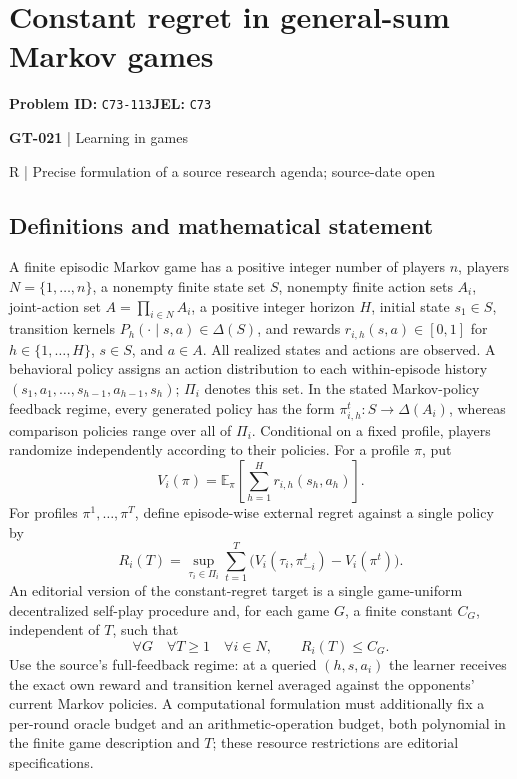 \documentclass[11pt,a4paper]{article}
\begin{document}
\section*{Constant regret in general-sum Markov games}
\textbf{Problem ID:} \texttt{C73-113}\quad \textbf{JEL:} \texttt{C73}\par
\label{problem:OP-0151}
\label{game:GT-021}
{\sffamily\small\color{muted}
{\sffamily\small\color{muted}\textbf{GT-021} | Learning in games\par R | Precise formulation of a source research agenda; source-date open\par}
\par}
\subsection*{Definitions and mathematical statement}
A finite episodic Markov game has a positive integer number of players $n$, players $N=\{1,\ldots,n\}$, a nonempty finite state set $S$, nonempty finite action sets $A_i$, joint-action set $A=\prod_{i\in N}A_i$, a positive integer horizon $H$, initial state $s_1\in S$, transition kernels $P_h(\cdot\mid s,a)\in\Delta(S)$, and rewards $r_{i,h}(s,a)\in[0,1]$ for $h\in\{1,\ldots,H\}$, $s\in S$, and $a\in A$. All realized states and actions are observed. A behavioral policy assigns an action distribution to each within-episode history $(s_1,a_1,\ldots,s_{h-1},a_{h-1},s_h)$; $\Pi_i$ denotes this set. In the stated Markov-policy feedback regime, every generated policy has the form $\pi^t_{i,h}:S\to\Delta(A_i)$, whereas comparison policies range over all of $\Pi_i$. Conditional on a fixed profile, players randomize independently according to their policies. For a profile $\pi$, put
\[
 V_i(\pi)=\mathbb E_{\pi}\!\left[\sum_{h=1}^{H}r_{i,h}(s_h,a_h)\right].
\]
For profiles $\pi^1,\ldots,\pi^T$, define episode-wise external regret against a single policy by
\[
 R_i(T)=\sup_{\tau_i\in\Pi_i}\sum_{t=1}^{T}
 \bigl(V_i(\tau_i,\pi^t_{-i})-V_i(\pi^t)\bigr).
\]
An editorial version of the constant-regret target is a single game-uniform decentralized self-play procedure and, for each game $G$, a finite constant $C_G$, independent of $T$, such that
\[
 \forall G\quad\forall T\geq1\quad\forall i\in N,\qquad R_i(T)\leq C_G.
\]
Use the source's full-feedback regime: at a queried $(h,s,a_i)$ the learner receives the exact own reward and transition kernel averaged against the opponents' current Markov policies. A computational formulation must additionally fix a per-round oracle budget and an arithmetic-operation budget, both polynomial in the finite game description and $T$; these resource restrictions are editorial specifications.
\end{document}
